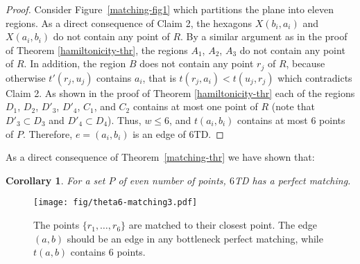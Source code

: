 \documentclass[11pt,a4paper]{article}
\newcommand{\kTD}[2]{$#1$\text{-}TD#2}
\newtheorem{corollary}{Corollary}
\begin{document}
\begin{proof}
Consider Figure~\ref{matching-fig1} which partitions the plane into eleven regions. As a direct consequence of Claim 2, the hexagons $X(b_i, a_i)$ and $X(a_i, b_i)$ do not contain any point of $R$. By a similar argument as in the proof of Theorem \ref{hamiltonicity-thr}, the regions $A_1$, $A_2$, $A_3$ do not contain any point of $R$. In addition, the region $B$ does not contain any point $r_j$ of $R$, because otherwise $t'(r_j,u_j)$ contains $a_i$, that is $t(r_j, a_i)< t(u_j, r_j)$ which contradicts Claim 2. As shown in the proof of Theorem \ref{hamiltonicity-thr} each of the regions $D_1$, $D_2$, $D'_3$, $D'_4$, $C_1$, and $C_2$ contains at most one point of $R$ (note that $D'_3\subset D_3$ and $D'_4\subset D_4$). Thus, $w \le 6$, and $t(a_i, b_i)$ contains at most 6 points of $P$. Therefore, $e=(a_i, b_i)$ is an edge of \kTD{6}{}.
\end{proof}

As a direct consequence of Theorem~\ref{matching-thr} we have shown that:
\begin{corollary}
 For a set $P$ of even number of points, \kTD{6}{} has a perfect matching.
\end{corollary}

\begin{figure}[htb]
  \centering
  \texttt{[image: fig/theta6-matching3.pdf]}
 \caption{The points $\{r_1,\dots,r_6\}$ are matched to their closest point. The edge $(a, b)$ should be an edge in any bottleneck perfect matching, while $t(a, b)$ contains 6 points.}
  \label{matching-fig3}
\end{figure}
\end{document}

